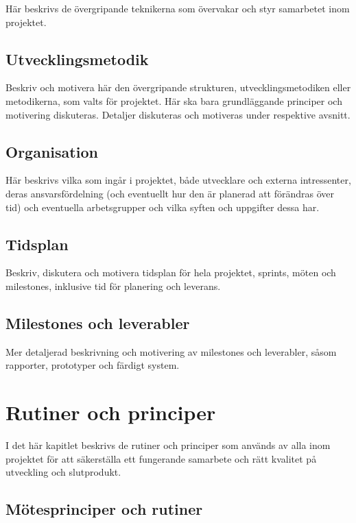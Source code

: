 \documentclass[a4paper,12pt,oneside,final]{extbook}
\begin{document}
Här beskrivs de övergripande teknikerna som övervakar och styr
samarbetet inom projektet.

\section{Utvecklingsmetodik}

Beskriv och motivera här den övergripande strukturen,
utvecklingsmetodiken eller metodikerna, som valts för projektet. Här
ska bara grundläggande principer och motivering diskuteras. Detaljer
diskuteras och motiveras under respektive avsnitt.

\section{Organisation}

Här beskrivs vilka som ingår i projektet, både utvecklare och externa
intressenter, deras ansvarsfördelning (och eventuellt hur den är
planerad att förändras över tid) och eventuella arbetsgrupper och
vilka syften och uppgifter dessa har.

\section{Tidsplan}

Beskriv, diskutera och motivera tidsplan för hela projektet, sprints,
möten och milestones, inklusive tid för planering och leverans.

\section{Milestones och leverabler}

Mer detaljerad beskrivning och motivering av milestones och
leverabler, såsom rapporter, prototyper och färdigt system.

\chapter{Rutiner och principer}

I det här kapitlet beskrivs de rutiner och principer som används av
alla inom projektet för att säkerställa ett fungerande samarbete och
rätt kvalitet på utveckling och slutprodukt.

\section{Mötesprinciper och rutiner}
\end{document}
